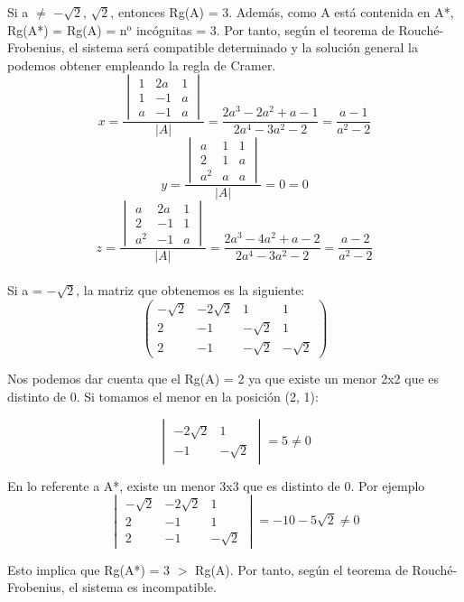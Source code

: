 \documentclass{article}
\begin{document}
Si a $\neq$ $- \sqrt{2}$, $\sqrt{2}$, entonces Rg(A) = 3. Adem\'as, como A est\'a contenida en A*, Rg(A*) = Rg(A) = n$^{\text{o}}$ inc\'ognitas = 3. Por tanto, seg\'un el teorema de Rouch\'e-Frobenius, el sistema ser\'a compatible determinado y la soluci\'on general la podemos obtener empleando la regla de Cramer.
$$
x=\frac{\begin{vmatrix}1 & 2 a & 1 \\1 & -1 & a\\a & -1 & a\end{vmatrix}}{|A|}=\frac{2 a^{3} - 2 a^{2} + a - 1}{2 a^{4} - 3 a^{2} - 2}=\frac{a - 1}{a^{2} - 2}$$$$
y=\frac{\begin{vmatrix}a & 1 & 1 \\2 & 1 & a\\a^{2} & a & a\end{vmatrix}}{|A|}=0=0$$$$
z=\frac{\begin{vmatrix}a & 2 a & 1 \\2 & -1 & 1\\a^{2} & -1 & a\end{vmatrix}}{|A|}=\frac{2 a^{3} - 4 a^{2} + a - 2}{2 a^{4} - 3 a^{2} - 2}=\frac{a - 2}{a^{2} - 2}$$\\

Si a = $- \sqrt{2}$, la matriz que obtenemos es la siguiente:
$$
\left(\begin{array}{ccc|c}- \sqrt{2} & - 2 \sqrt{2} & 1 & 1 \\2 & -1 & - \sqrt{2} & 1\\2 & -1 & - \sqrt{2} & - \sqrt{2}\end{array}\right)$$

Nos podemos dar cuenta que el Rg(A) = 2 ya que existe un menor 2x2 que es distinto de 0. Si tomamos el menor en la posici\'on (2, 1):

$$
\begin{vmatrix}- 2 \sqrt{2} & 1\\-1 & - \sqrt{2}\end{vmatrix} = 5 \neq 0$$

En lo referente a A*, existe un menor 3x3 que es distinto de 0. Por ejemplo $$
\begin{vmatrix}- \sqrt{2} & - 2 \sqrt{2} & 1 \\2 & -1 & 1\\2 & -1 & - \sqrt{2}\end{vmatrix} = -10 - 5 \sqrt{2} \neq 0$$

Esto implica que Rg(A*) = 3 $>$ Rg(A). Por tanto, seg\'un el teorema de Rouch\'e-Frobenius, el sistema es incompatible.\\
\end{document}
